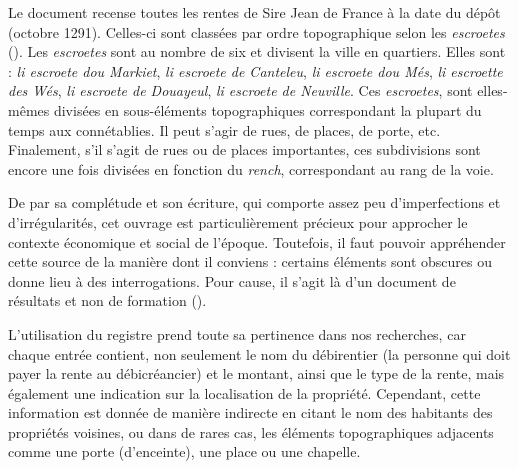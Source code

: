 Le document recense toutes les rentes de Sire Jean de France à la date du dépôt (octobre 1291). Celles-ci sont classées par ordre topographique selon les \textit{escroetes} (\cite{espinas_les_1933}). Les \textit{escroetes} sont au nombre de six et divisent la ville en quartiers. Elles sont : \textit{li escroete dou Markiet}, \textit{li escroete de Canteleu}, \textit{li escroete dou Més}, \textit{li escroette des Wés}, \textit{li escroete de Douayeul}, \textit{li escroete de Neuville}.
Ces \textit{escroetes}, sont elles-mêmes divisées en sous-éléments topographiques correspondant la plupart du temps aux connétablies. Il peut s'agir de rues, de places, de porte, etc. Finalement, s'il s'agit de rues ou de places importantes, ces subdivisions sont encore une fois divisées en fonction du \textit{rench}, correspondant au rang de la voie.

De par sa complétude et son écriture, qui comporte assez peu d'imperfections et d'irrégularités, cet ouvrage est particulièrement précieux pour approcher le contexte économique et social de l'époque. 
Toutefois, il faut pouvoir appréhender cette source de la manière dont il conviens : certains éléments sont obscures ou donne lieu à des interrogations. Pour cause, il s'agit là d'un document de résultats et non de formation (\cite{espinas_les_1933}).

L'utilisation du registre prend toute sa pertinence dans nos recherches, car chaque entrée contient, non seulement le nom du débirentier (la personne qui doit payer la rente au débicréancier)
et le montant, ainsi que le type de la rente, mais également une indication sur la localisation de la propriété. Cependant, cette information est donnée de manière indirecte en citant le nom des habitants des propriétés voisines, ou dans de rares cas, les éléments topographiques adjacents comme une porte (d'enceinte), une place ou une chapelle.

